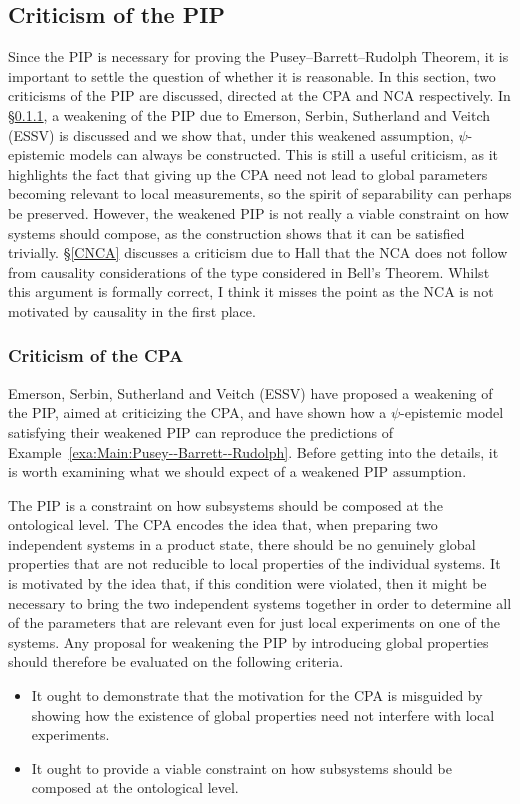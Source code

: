 \documentclass[DIV=calc,fontsize=12pt]{scrartcl} %
\theoremstyle{definition}
\theoremstyle{plain}
\begin{document}
\subsection{Criticism of the PIP}

\label{CPIP}

Since the PIP is necessary for proving the Pusey--Barrett--Rudolph Theorem, it is
important to settle the question of whether it is reasonable.  In this
section, two criticisms of the PIP are discussed, directed at the CPA
and NCA respectively.  In \S\ref{CCPA}, a weakening of the PIP due to
Emerson, Serbin, Sutherland and Veitch (ESSV) \cite{Emerson2013} is
discussed and we show that, under this weakened assumption,
$\psi$-epistemic models can always be constructed.  This is still a
useful criticism, as it highlights the fact that giving up the CPA
need not lead to global parameters becoming relevant to local
measurements, so the spirit of separability can perhaps be preserved.
However, the weakened PIP is not really a viable constraint on how
systems should compose, as the construction shows that it can be
satisfied trivially.  \S\ref{CNCA} discusses a criticism due to Hall
\cite{Hall2011} that the NCA does not follow from causality
considerations of the type considered in Bell's Theorem.  Whilst this
argument is formally correct, I think it misses the point as the NCA
is not motivated by causality in the first place.

\subsubsection{Criticism of the CPA}

\label{CCPA}

Emerson, Serbin, Sutherland and Veitch (ESSV) \cite{Emerson2013} have
proposed a weakening of the PIP, aimed at criticizing the CPA, and
have shown how a $\psi$-epistemic model satisfying their weakened PIP
can reproduce the predictions of Example~\ref{exa:Main:Pusey--Barrett--Rudolph}.  Before
getting into the details, it is worth examining what we should expect
of a weakened PIP assumption.

The PIP is a constraint on how subsystems should be composed at the
ontological level.  The CPA encodes the idea that, when preparing two
independent systems in a product state, there should be no genuinely
global properties that are not reducible to local properties of the
individual systems.  It is motivated by the idea that, if this
condition were violated, then it might be necessary to bring the two
independent systems together in order to determine all of the
parameters that are relevant even for just local experiments on one of
the systems.  Any proposal for weakening the PIP by introducing global
properties should therefore be evaluated on the following criteria.
\begin{itemize}
\item It ought to demonstrate that the motivation for the CPA is
misguided by showing how the existence of global properties need not
interfere with local experiments.
\item It ought to provide a viable constraint on how subsystems should
be composed at the ontological level.
\end{itemize}
\end{document}
